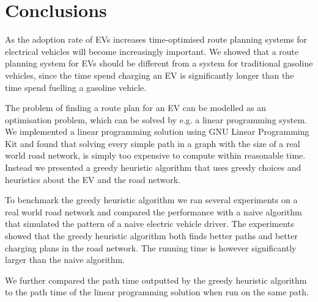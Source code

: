 \section{Conclusions}
As the adoption rate of EVs increases time-optimised route planning systems for electrical vehicles will become increasingly important. 
We showed that a route planning system for EVs should be different from a system for traditional gasoline vehicles, since the time spend 
charging an EV is significantly longer than the time spend fuelling a gasoline vehicle. 

The problem of finding a route plan for an EV can be modelled as an optimisation problem, which can be solved by e.g. a linear programming system. We implemented a linear programming solution using GNU Linear Programming Kit and found that solving every simple path in a graph with the size of a real world road network, is simply too expensive to compute within reasonable time. Instead we presented a greedy heuristic algorithm that uses greedy choices and heuristics about the EV and the road network.

To benchmark the greedy heuristic algorithm we ran several experiments on a real world road network and compared the performance with a naive algorithm that simulated the pattern of a naive electric vehicle driver. The experiments showed that the greedy heuristic algorithm both finds better paths and better charging plans in the road network. The running time is however significantly larger than the naive algorithm.

We further compared the path time outputted by the greedy heuristic algorithm to the path time of the linear programming solution when run on the same path.
  